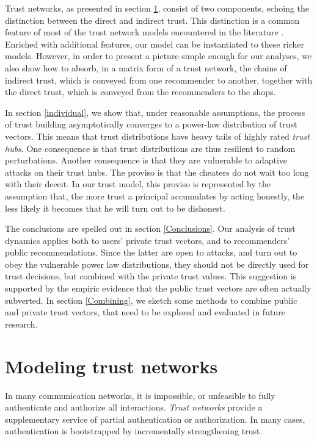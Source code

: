 \documentclass{llncs}
\newcommand{\indiv}{private}
\begin{document}
Trust networks, as presented in section \ref{Modeling}, consist of two components, echoing the distinction between the direct and indirect trust. This distinction is a common feature of most of the trust network models encountered in the literature \cite{BBK,LevienR,MaurerU:Trust,ReiterM:Metric}. Enriched with additional features, our model can be instantiated to these richer models. However, in order to present a picture simple enough for our analyses, we also show how to absorb, in a matrix form of a trust network, the chains of indirect trust, which is conveyed from one recommender to another, together with the direct trust, which is conveyed from the recommenders to the shops. 

In section  \ref{individual}, we show that, under reasonable assumptions, the process of trust building asymptotically converges to a power-law distribution of trust vectors. This means that trust distributions have heavy tails of highly rated {\em trust hubs}. One consequence is that trust distributions are thus resilient to random perturbations. Another consequence is that they are vulnerable to adaptive attacks on their trust hubs. The proviso is that the cheaters do not wait too long with their deceit. In our trust model, this proviso is represented by the assumption that, the more trust a principal accumulates by acting honestly, the less likely it becomes that he will turn out to be dishonest.

The conclusions are spelled out in section \ref{Conclusions}. Our analysis of trust dynamics applies both to  users' private trust vectors, and to recommenders' public recommendations. Since the latter are open to attacks, and turn out to obey the vulnerable power law distributions, they should not be directly used for trust decisions, but combined with the {\indiv} trust values. This suggestion is supported by the empiric evidence that the public trust vectors are often actually subverted\cite{EdelmanB:adverse}.  In section \ref{Combining}, we sketch some methods to combine public and private trust vectors, that need to be explored and evaluated in future research.


\section{Modeling trust networks}\label{Modeling}
In many communication networks, it is impossible, or unfeasible to fully authenticate and authorize all interactions. {\em Trust networks}\/ provide a supplementary service of partial authentication or authorization. In many cases, authentication is bootstrapped by incrementally strengthening trust. 
\end{document}
